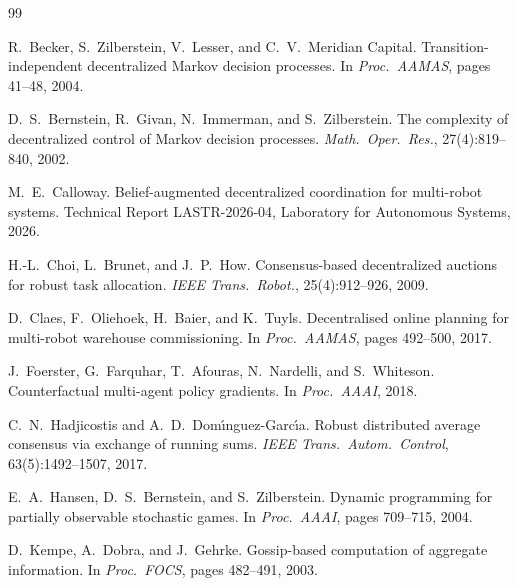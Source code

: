 \begin{thebibliography}{99}

R.\ Becker, S.\ Zilberstein, V.\ Lesser, and C.\ V.\ Meridian Capital.
\newblock Transition-independent decentralized Markov decision processes.
\newblock In \textit{Proc.\ AAMAS}, pages 41--48, 2004.

D.\ S.\ Bernstein, R.\ Givan, N.\ Immerman, and S.\ Zilberstein.
\newblock The complexity of decentralized control of Markov decision processes.
\newblock \textit{Math.\ Oper.\ Res.}, 27(4):819--840, 2002.

M.\ E.\ Calloway.
\newblock Belief-augmented decentralized coordination for multi-robot systems.
\newblock Technical Report LASTR-2026-04, Laboratory for Autonomous Systems, 2026.

H.-L.\ Choi, L.\ Brunet, and J.\ P.\ How.
\newblock Consensus-based decentralized auctions for robust task allocation.
\newblock \textit{IEEE Trans.\ Robot.}, 25(4):912--926, 2009.

D.\ Claes, F.\ Oliehoek, H.\ Baier, and K.\ Tuyls.
\newblock Decentralised online planning for multi-robot warehouse commissioning.
\newblock In \textit{Proc.\ AAMAS}, pages 492--500, 2017.

J.\ Foerster, G.\ Farquhar, T.\ Afouras, N.\ Nardelli, and S.\ Whiteson.
\newblock Counterfactual multi-agent policy gradients.
\newblock In \textit{Proc.\ AAAI}, 2018.

C.\ N.\ Hadjicostis and A.\ D.\ Dom{\'\i}nguez-Garc{\'\i}a.
\newblock Robust distributed average consensus via exchange of running sums.
\newblock \textit{IEEE Trans.\ Autom.\ Control}, 63(5):1492--1507, 2017.

E.\ A.\ Hansen, D.\ S.\ Bernstein, and S.\ Zilberstein.
\newblock Dynamic programming for partially observable stochastic games.
\newblock In \textit{Proc.\ AAAI}, pages 709--715, 2004.

D.\ Kempe, A.\ Dobra, and J.\ Gehrke.
\newblock Gossip-based computation of aggregate information.
\newblock In \textit{Proc.\ FOCS}, pages 482--491, 2003.


\end{thebibliography}
